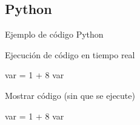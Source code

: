 \documentclass[10pt, envcountsect, presentation, aspectratio=43]{beamer}
\begin{document}
\subsection{Python}


\begin{frame}[fragile]{Ejemplo de código Python}

\begin{block}{Ejecución de código en tiempo real}
\begin{pyconsole}
var = 1 + 8
var
\end{pyconsole}
\end{block}


\begin{block}{Mostrar código (sin que se ejecute)}
\begin{pyverbatim}
var = 1 + 8
var
\end{pyverbatim}
\end{block}




%
%
%
%
%
%
%
%
%




\end{frame}
\end{document}
